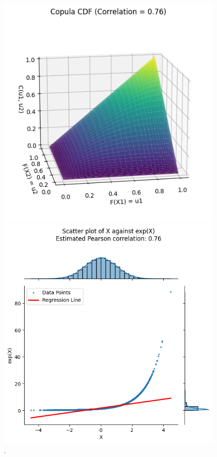 \begin{figure}
\begin{minipage}{0.4\textwidth}
        \subcaption{}
    \end{minipage}
    \vfill
    \begin{minipage}{0.4\textwidth}
        \centering
        \includegraphics[width=\textwidth]{3Theory/pictures/CorrelationEstimationExponential.png}
        \subcaption{}
    \end{minipage}
    \hfill
    \begin{minipage}{0.4\textwidth}
        \centering
        \includegraphics[width=\textwidth]{3Theory/pictures/exponentialDependenceScatterRet.png}
        \subcaption{}
    \end{minipage}
    \caption{.}
\end{figure}

